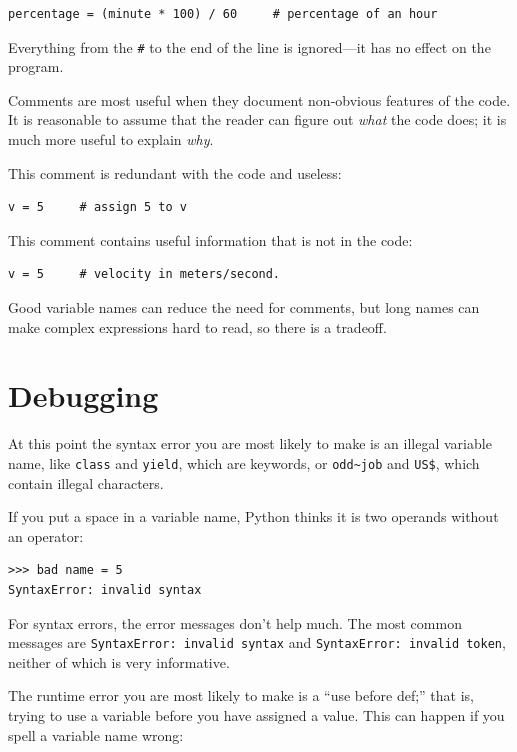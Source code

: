 \documentclass[10pt]{book}
\begin{document}
\begin{verbatim}
percentage = (minute * 100) / 60     # percentage of an hour
\end{verbatim}
%
Everything from the {\tt \#} to the end of the line is ignored---it
has no effect on the program.

Comments are most useful when they document non-obvious features of
the code.  It is reasonable to assume that the reader can figure out
{\em what} the code does; it is much more useful to explain {\em why}.

This comment is redundant with the code and useless:

\begin{verbatim}
v = 5     # assign 5 to v
\end{verbatim}
%
This comment contains useful information that is not in the code:

\begin{verbatim}
v = 5     # velocity in meters/second. 
\end{verbatim}
%
Good variable names can reduce the need for comments, but
long names can make complex expressions hard to read, so there is
a tradeoff.


\section{Debugging}

At this point the syntax error you are most likely to make is
an illegal variable name, like {\tt class} and {\tt yield}, which
are keywords, or \verb"odd~job" and \verb"US$", which contain
illegal characters.

If you put a space in a variable name, Python thinks it is two
operands without an operator:

\begin{verbatim}
>>> bad name = 5
SyntaxError: invalid syntax
\end{verbatim}
%
For syntax errors, the error messages don't help much.
The most common messages are {\tt SyntaxError: invalid syntax} and
{\tt SyntaxError: invalid token}, neither of which is very informative.

The runtime error you are most likely to make is a ``use before
def;'' that is, trying to use a variable before you have assigned
a value.  This can happen if you spell a variable name wrong:
\end{document}
